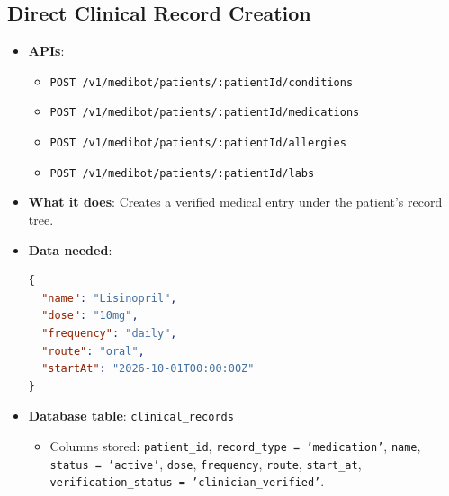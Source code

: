 \documentclass[11pt,a4paper]{article}
\begin{document}
\subsection{Direct Clinical Record Creation}
\begin{itemize}
    \item \textbf{APIs}:
    \begin{itemize}
        \item \texttt{POST /v1/medibot/patients/:patientId/conditions}
        \item \texttt{POST /v1/medibot/patients/:patientId/medications}
        \item \texttt{POST /v1/medibot/patients/:patientId/allergies}
        \item \texttt{POST /v1/medibot/patients/:patientId/labs}
    \end{itemize}
    \item \textbf{What it does}: Creates a verified medical entry under the patient's record tree.
    \item \textbf{Data needed}:
\begin{lstlisting}[language=json]
{
  "name": "Lisinopril",
  "dose": "10mg",
  "frequency": "daily",
  "route": "oral",
  "startAt": "2026-10-01T00:00:00Z"
}
\end{lstlisting}
    \item \textbf{Database table}: \texttt{clinical\_records}
    \begin{itemize}
        \item Columns stored: \texttt{patient\_id}, \texttt{record\_type = 'medication'}, \texttt{name}, \texttt{status = 'active'}, \texttt{dose}, \texttt{frequency}, \texttt{route}, \texttt{start\_at}, \texttt{verification\_status = 'clinician\_verified'}.
    \end{itemize}
\end{itemize}
\end{document}
